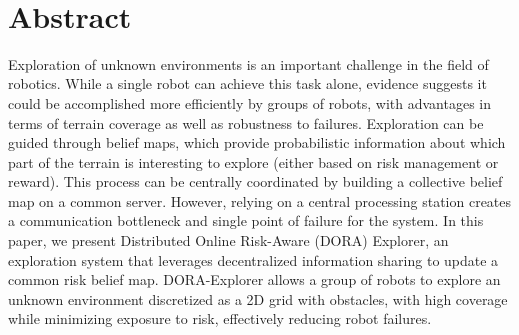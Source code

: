 \label{sec:Theme1}
 
\noindent{}\\

\section{Abstract}
    Exploration of unknown environments is an important challenge in the
    field of robotics. While a single robot can achieve this task alone,
    evidence suggests it could be accomplished more efficiently by
    groups of robots, with advantages in terms of terrain coverage as
    well as robustness to failures. Exploration can be guided through
    belief maps, which provide probabilistic information about which
    part of the terrain is interesting to explore (either based on risk
    management or reward). This process can be centrally coordinated by
    building a collective belief map on a common server. However,
    relying on a central processing station creates a communication
    bottleneck and single point of failure for the system. In this
    paper, we present Distributed Online Risk-Aware (DORA) Explorer, an
    exploration system that leverages decentralized information sharing
    to update a common risk belief map. DORA-Explorer allows a group of
    robots to explore an unknown environment discretized as a 2D grid
    with obstacles, with high coverage while minimizing exposure to
    risk, effectively reducing robot failures.


